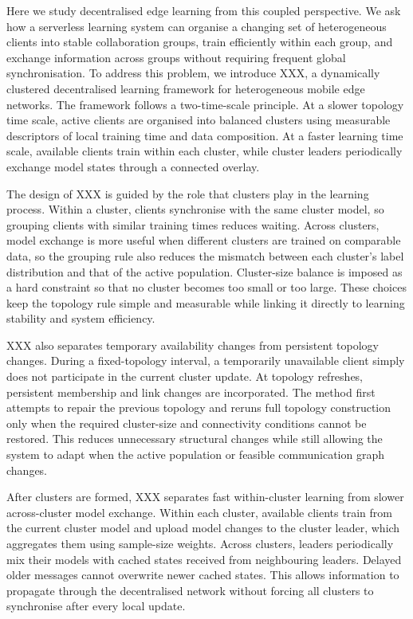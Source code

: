 \documentclass[pdflatex,sn-mathphys-num]{sn-jnl}
\begin{document}
Here we study decentralised edge learning from this coupled perspective. We ask how a serverless learning system can organise a changing set of heterogeneous clients into stable collaboration groups, train efficiently within each group, and exchange information across groups without requiring frequent global synchronisation. To address this problem, we introduce XXX, a dynamically clustered decentralised learning framework for heterogeneous mobile edge networks. The framework follows a two-time-scale principle. At a slower topology time scale, active clients are organised into balanced clusters using measurable descriptors of local training time and data composition. At a faster learning time scale, available clients train within each cluster, while cluster leaders periodically exchange model states through a connected overlay.

The design of XXX is guided by the role that clusters play in the learning process. Within a cluster, clients synchronise with the same cluster model, so grouping clients with similar training times reduces waiting. Across clusters, model exchange is more useful when different clusters are trained on comparable data, so the grouping rule also reduces the mismatch between each cluster's label distribution and that of the active population. Cluster-size balance is imposed as a hard constraint so that no cluster becomes too small or too large. These choices keep the topology rule simple and measurable while linking it directly to learning stability and system efficiency.

XXX also separates temporary availability changes from persistent topology changes. During a fixed-topology interval, a temporarily unavailable client simply does not participate in the current cluster update. At topology refreshes, persistent membership and link changes are incorporated. The method first attempts to repair the previous topology and reruns full topology construction only when the required cluster-size and connectivity conditions cannot be restored. This reduces unnecessary structural changes while still allowing the system to adapt when the active population or feasible communication graph changes.

After clusters are formed, XXX separates fast within-cluster learning from slower across-cluster model exchange. Within each cluster, available clients train from the current cluster model and upload model changes to the cluster leader, which aggregates them using sample-size weights. Across clusters, leaders periodically mix their models with cached states received from neighbouring leaders. Delayed older messages cannot overwrite newer cached states. This allows information to propagate through the decentralised network without forcing all clusters to synchronise after every local update.
\end{document}
